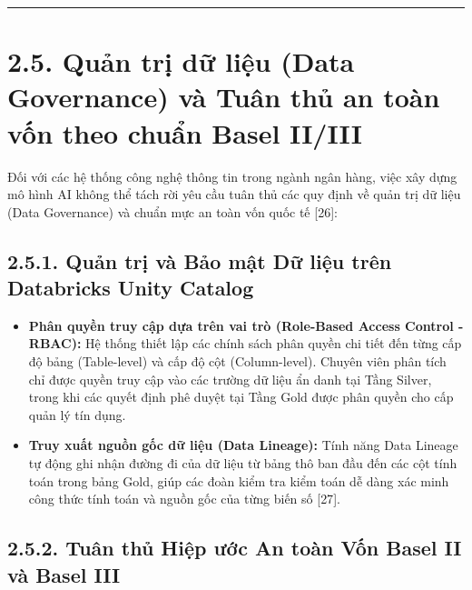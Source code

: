 \documentclass[
  13pt,
  a4paper,
]{report}
\providecommand{\tightlist}{%
  \setlength{\itemsep}{0pt}\setlength{\parskip}{0pt}}
\begin{document}
\begin{center}\rule{0.5\linewidth}{0.5pt}\end{center}

\section{2.5. Quản trị dữ liệu (Data Governance) và Tuân thủ an toàn vốn
theo chuẩn Basel
II/III}\label{quux1ea3n-trux1ecb-dux1eef-liux1ec7u-data-governance-vuxe0-tuuxe2n-thux1ee7-an-touxe0n-vux1ed1n-theo-chuux1ea9n-basel-iiiii}

Đối với các hệ thống công nghệ thông tin trong ngành ngân hàng, việc xây
dựng mô hình AI không thể tách rời yêu cầu tuân thủ các quy định về quản
trị dữ liệu (Data Governance) và chuẩn mực an toàn vốn quốc tế {[}26{]}:

\subsection{2.5.1. Quản trị và Bảo mật Dữ liệu trên Databricks Unity
Catalog}\label{quux1ea3n-trux1ecb-vuxe0-bux1ea3o-mux1eadt-dux1eef-liux1ec7u-truxean-databricks-unity-catalog}

\begin{itemize}
\tightlist
\item
  \textbf{Phân quyền truy cập dựa trên vai trò (Role-Based Access
  Control - RBAC):} Hệ thống thiết lập các chính sách phân quyền chi
  tiết đến từng cấp độ bảng (Table-level) và cấp độ cột (Column-level).
  Chuyên viên phân tích chỉ được quyền truy cập vào các trường dữ liệu
  ẩn danh tại Tầng Silver, trong khi các quyết định phê duyệt tại Tầng
  Gold được phân quyền cho cấp quản lý tín dụng.
\item
  \textbf{Truy xuất nguồn gốc dữ liệu (Data Lineage):} Tính năng Data
  Lineage tự động ghi nhận đường đi của dữ liệu từ bảng thô ban đầu đến
  các cột tính toán trong bảng Gold, giúp các đoàn kiểm tra kiểm toán dễ
  dàng xác minh công thức tính toán và nguồn gốc của từng biến số
  {[}27{]}.
\end{itemize}

\subsection{2.5.2. Tuân thủ Hiệp ước An toàn Vốn Basel II và Basel
III}\label{tuuxe2n-thux1ee7-hiux1ec7p-ux1b0ux1edbc-an-touxe0n-vux1ed1n-basel-ii-vuxe0-basel-iii}
\end{document}
